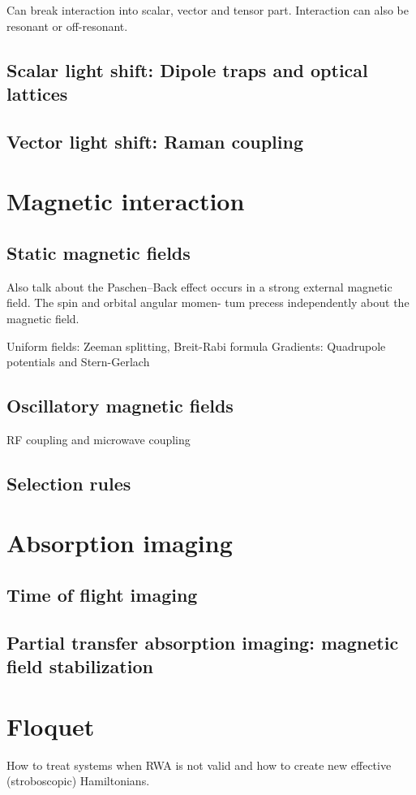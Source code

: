 Can break interaction into scalar, vector and tensor part. Interaction can also be resonant or off-resonant.


\subsection{Scalar light shift: Dipole traps and optical lattices}

\subsection{Vector light shift: Raman coupling}

\section{Magnetic interaction}
\subsection{Static magnetic fields}
Also talk about the Paschen–Back effect occurs in a strong external magnetic field. The spin and orbital angular momen- tum precess independently about the magnetic field.

Uniform fields: Zeeman splitting, Breit-Rabi formula
Gradients: Quadrupole potentials and Stern-Gerlach

\subsection{Oscillatory magnetic fields}
RF coupling and microwave coupling

\subsection{Selection rules}

\section{Absorption imaging}
\subsection{Time of flight imaging}
\subsection{Partial transfer absorption imaging: magnetic field stabilization}

\section{Floquet}
How to treat systems when RWA is not valid and how to create new effective (stroboscopic) Hamiltonians.